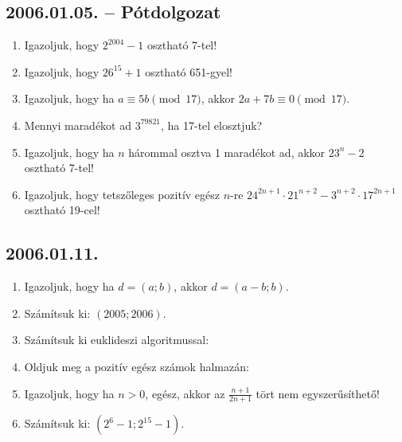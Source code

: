 \subsection*{2006.01.05. -- Pótdolgozat}
\begin{enumerate}
\item Igazoljuk, hogy $2^{2004}-1$ osztható 7-tel!
\item Igazoljuk, hogy $26^{15}+1$ osztható 651-gyel!
\item Igazoljuk, hogy ha $a\equiv 5b \pmod{17}$,
akkor $2a+7b\equiv 0 \pmod{17}$.
\item Mennyi maradékot ad $3^{79821}$, ha 17-tel elosztjuk?
\item Igazoljuk, hogy ha $n$ hárommal osztva 1 maradékot ad, akkor $23^n-2$ osztható 7-tel!
\item Igazoljuk, hogy tetszőleges pozitív egész $n$-re $24^{2n+1}\cdot 21^{n+2}-3^{n+2}\cdot 17^{2n+1}$ 
osztható 19-cel!
\end{enumerate}

\subsection*{2006.01.11.}
\begin{enumerate}
\item Igazoljuk, hogy ha $d=(a;b)$, akkor $d=(a-b;b)$.
\item Számítsuk ki: $(2005;2006)$.
\item Számítsuk ki euklideszi algoritmussal:
\item Oldjuk meg a pozitív egész számok halmazán:
\item Igazoljuk, hogy ha $n>0$, egész, akkor az
$\frac{n+1}{2n+1}$ tört nem egyszerűsíthető! 
\item Számítsuk ki: $\left(2^6-1;2^{15}-1\right)$.
\end{enumerate}

